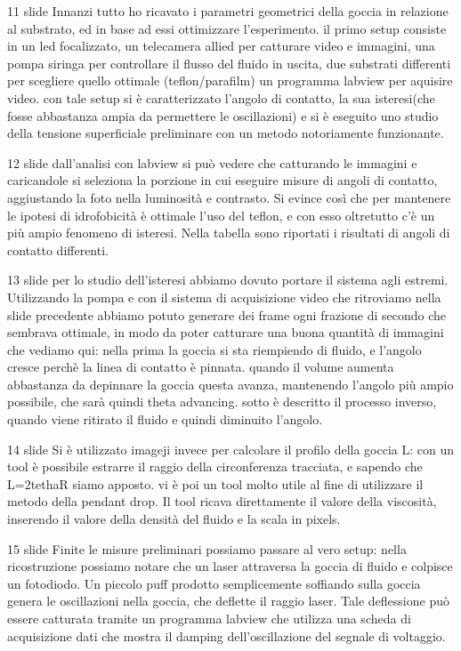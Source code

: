 11 slide
Innanzi tutto ho ricavato i parametri geometrici della goccia in relazione al substrato, ed in base ad essi ottimizzare l'esperimento. il primo setup consiste in un led focalizzato, un telecamera allied per catturare video e immagini, una pompa siringa per controllare il flusso del fluido in uscita, due substrati differenti per scegliere quello ottimale (teflon/parafilm) un programma labview per aquisire video. con tale setup si è caratterizzato l'angolo di contatto, la sua isteresi(che fosse abbastanza ampia da permettere le oscillazioni) e si è eseguito uno studio della tensione superficiale preliminare con un metodo notoriamente funzionante.

12 slide
dall'analisi con labview si può vedere che catturando le immagini e caricandole si seleziona la porzione in cui eseguire misure di angoli di contatto, aggiustando la foto nella luminosità e contrasto. Si evince così che per mantenere le ipotesi di idrofobicità è ottimale l'uso del teflon, e con esso oltretutto c'è un più ampio fenomeno di isteresi.
Nella tabella sono riportati i risultati di angoli di contatto differenti.

13 slide
per lo studio dell'isteresi abbiamo dovuto portare il sistema agli estremi. Utilizzando la pompa e con il sistema di acquisizione video che ritroviamo nella slide precedente abbiamo potuto generare dei frame ogni frazione di secondo che sembrava ottimale, in modo da poter catturare una buona quantità di immagini che vediamo qui: nella prima la goccia si sta riempiendo di fluido, e l'angolo cresce perchè la linea di contatto è pinnata. quando il volume aumenta abbastanza da depinnare la goccia questa avanza, mantenendo l'angolo più ampio possibile, che sarà quindi theta advancing. sotto è descritto il processo inverso, quando viene ritirato il fluido e quindi diminuito l'angolo.

14 slide
Si è utilizzato imageji invece per calcolare il profilo della goccia L: con un tool è possibile estrarre il raggio della circonferenza tracciata, e sapendo che L=2tethaR siamo apposto. vi è poi un tool molto utile al fine di utilizzare il metodo della pendant drop. Il tool ricava direttamente il valore della viscosità, inserendo il valore della densità del fluido e la scala in pixels.

15 slide
Finite le misure preliminari possiamo passare al vero setup: nella ricostruzione possiamo notare che un laser attraversa la goccia di fluido e colpisce un fotodiodo. Un piccolo puff prodotto semplicemente soffiando sulla goccia genera le oscillazioni nella goccia, che deflette il raggio laser. Tale deflessione può essere catturata tramite un programma labview che utilizza una scheda di acquisizione dati che mostra il damping dell'oscillazione del segnale di voltaggio. 

